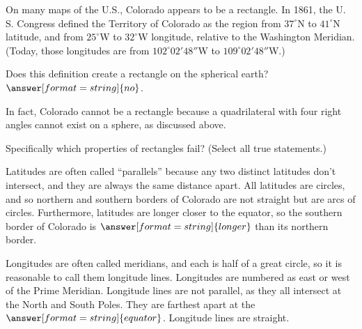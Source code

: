 \documentclass{ximera}
\begin{document}
\begin{problem}
On many maps of the U.S., Colorado appears to be a rectangle.  In 1861, the U. S. Congress defined the Territory of Colorado as the region from $37^\circ$N to $41^\circ$N latitude, and from $25^\circ$W to $32^\circ$W longitude, relative to the Washington Meridian.  (Today, those longitudes are from $102^\circ02'48''$W to $109^\circ02'48''$W.) 

Does this definition create a rectangle on the spherical earth?   $\answer[format=string]{no}$.

\begin{problem}
In fact, Colorado cannot be a rectangle because a quadrilateral with four right angles cannot exist on a sphere, as discussed above.  

Specifically which properties of rectangles fail?  (Select all true statements.) 

\begin{selectAll}
\end{selectAll}

\begin{problem}

Latitudes are often called ``parallels'' because any two distinct latitudes don't intersect, and they are always the same distance apart.   All latitudes are circles, and so northern and southern borders of Colorado are not straight but are arcs of circles. Furthermore, latitudes are longer closer to the equator, so the southern border of Colorado is $\answer[format=string]{longer}$ than its northern border.  


Longitudes are often called meridians, and each is half of a great circle, so it is reasonable to call them longitude lines.  Longitudes are numbered as east or west of the Prime Meridian.  Longitude lines are not parallel, as they all intersect at the North and South Poles. They are farthest apart at the $\answer[format=string]{equator}$.  Longitude lines are straight.  


\end{problem}
\end{problem}
\end{problem}
\end{document}
